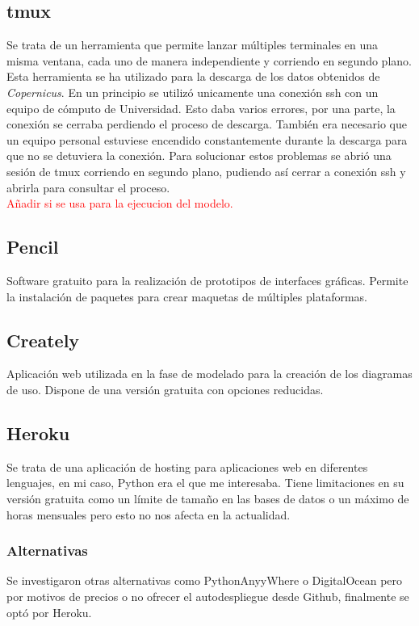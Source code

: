 	\subsection{tmux}\label{tmux}
Se trata de un herramienta que permite lanzar múltiples terminales en una misma ventana, cada uno de manera independiente y corriendo en segundo plano. Esta herramienta se ha utilizado para la descarga de los datos obtenidos de \emph{Copernicus}. En un principio se utilizó unicamente una conexión ssh con un equipo de cómputo de Universidad. Esto daba varios errores, por una parte, la conexión se cerraba perdiendo el proceso de descarga. También era necesario que un equipo personal estuviese encendido constantemente durante la descarga para que no se detuviera la conexión. Para solucionar estos problemas se abrió una sesión de tmux corriendo en segundo plano, pudiendo así cerrar a conexión ssh y abrirla para consultar el proceso.\\
\textcolor{red}{Añadir si se usa para la ejecucion del modelo.}

	\subsection{Pencil}
Software gratuito para la realización de prototipos de interfaces gráficas. Permite la instalación de paquetes para crear maquetas de múltiples plataformas. 
	
	\subsection{Creately}
Aplicación web utilizada en la fase de modelado para la creación de los diagramas de uso. Dispone de una versión gratuita con opciones reducidas.

	\subsection{Heroku}\label{HerokuHerrramientas}
Se trata de una aplicación de hosting para aplicaciones web en diferentes lenguajes, en mi caso, Python era el que me interesaba. 
Tiene limitaciones en su versión gratuita como un límite de tamaño en las bases de datos o un máximo de horas mensuales pero esto no nos afecta en la actualidad.
	\subsubsection{Alternativas}
Se investigaron otras alternativas como PythonAnyyWhere o DigitalOcean pero por motivos de precios o no ofrecer el autodespliegue desde Github, finalmente se optó por Heroku.

